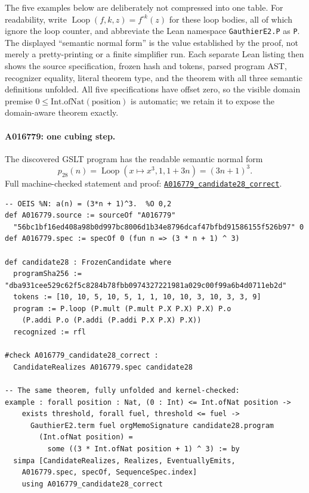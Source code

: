 \documentclass[11pt]{article}
\newcommand{\code}[1]{\texttt{#1}}
\newcommand{\formalcommit}{f3a31db36bb2f944312ee31c1d86c2758109e83a}
\newcommand{\formalblob}{https://github.com/zariuq/MeTTapedia/blob/\formalcommit/lean/mettapedia/Mettapedia}
\newcommand{\leansource}[3]{%
  \href{\formalblob/#1\#L#2}{\nolinkurl{#3}}}
\begin{document}
The five examples below are deliberately not compressed into one table. For readability,
write $\operatorname{Loop}(f,k,z)=f^{\circ k}(z)$ for these loop bodies, all of which ignore
the loop counter, and abbreviate the Lean namespace \code{GauthierE2.P} as \code{P}. The
displayed ``semantic normal form'' is the value established by the proof, not merely a
pretty-printing or a finite simplifier run. Each separate Lean listing then shows the source
specification, frozen hash and tokens, parsed program AST, recognizer equality, literal
theorem type, and the theorem with all three semantic definitions unfolded. All five
specifications have offset zero, so the visible domain premise
$0\leq\mathrm{Int.ofNat}(\mathrm{position})$ is automatic; we retain it to expose the
domain-aware theorem exactly.

\paragraph{A016779: one cubing step.}
The discovered GSLT program has the readable semantic normal form
\[
p_{28}(n)=\operatorname{Loop}(x\mapsto x^3,1,1+3n)=(3n+1)^3.
\]
\noindent Full machine-checked statement and proof:
\leansource{GSLT/LanguageDef/Gauthier/Adjudications33.lean}{248-L263}{A016779_candidate28_correct}.
\begin{lstlisting}[caption={A016779, discovered exclusively by the recurrent-vector arm
in world 1, generation 8. The proof ranges over the entire domain, not only the 36
published terms.}]
-- OEIS %N: a(n) = (3*n + 1)^3.  %O 0,2
def A016779.source := sourceOf "A016779"
  "56bc1bf16ed408a98b0d997bc8006d1b34e8796dcaf47bfbd91586155f526b97" 0
def A016779.spec := specOf 0 (fun n => (3 * n + 1) ^ 3)

def candidate28 : FrozenCandidate where
  programSha256 := "dba931cee529c62f5c8284b78fbb0974327221981a029c00f99a6b4d0711eb2d"
  tokens := [10, 10, 5, 10, 5, 1, 1, 10, 10, 3, 10, 3, 3, 9]
  program := P.loop (P.mult (P.mult P.X P.X) P.X) P.o
    (P.addi P.o (P.addi (P.addi P.X P.X) P.X))
  recognized := rfl

#check A016779_candidate28_correct :
  CandidateRealizes A016779.spec candidate28

-- The same theorem, fully unfolded and kernel-checked:
example : forall position : Nat, (0 : Int) <= Int.ofNat position ->
    exists threshold, forall fuel, threshold <= fuel ->
      GauthierE2.term fuel orgMemoSignature candidate28.program
        (Int.ofNat position) =
          some ((3 * Int.ofNat position + 1) ^ 3) := by
  simpa [CandidateRealizes, Realizes, EventuallyEmits,
    A016779.spec, specOf, SequenceSpec.index]
    using A016779_candidate28_correct
\end{lstlisting}
\end{document}
